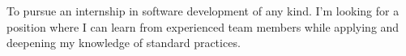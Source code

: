 

\begin{cvparagraph}

To pursue an internship in software development of any kind. 
I'm looking for a position where I can learn from experienced team
members while applying and deepening my knowledge of standard practices.
\end{cvparagraph}

